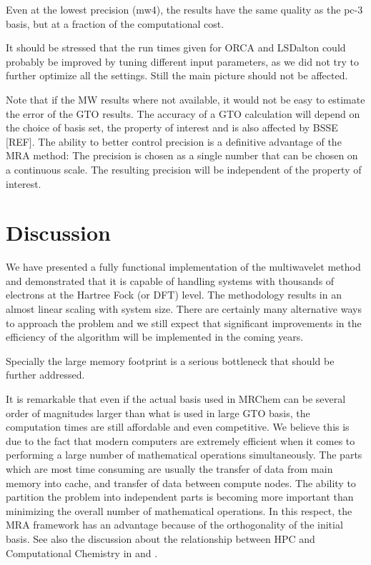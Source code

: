 \documentclass[%
 aip,
 amsmath,amssymb,
 reprint,%
]{revtex4-1}
\begin{document}
Even at the lowest precision (mw4), the results have the same quality as the pc-3 basis, but at a fraction of the computational cost. 

It should be stressed that the run times given for ORCA\cite{orca} and LSDalton\cite{lsdalton} could probably be improved by tuning different input parameters, as we did not try to further optimize all the settings. Still the main picture should not be affected.

Note that if the MW results where not available, it would not be easy to estimate the error of the GTO results. The accuracy of a GTO calculation will depend on the choice of basis set, the property of interest and is also affected by BSSE [REF].
The ability to better control precision is a definitive advantage of the MRA method:
The precision is chosen as a single number that can be chosen on a continuous scale. The resulting precision will be independent of the property of interest. %


\section{Discussion}

We have presented a fully functional implementation of the multiwavelet method and demonstrated that it is capable of handling systems with thousands of electrons at the Hartree Fock (or DFT) level. The methodology results in an almost linear scaling with system size. There are certainly many alternative ways to approach the problem and we still expect that significant improvements in the efficiency of the algorithm will be implemented in the coming years. 

Specially the large memory footprint is a serious bottleneck that should be further addressed. %


It is remarkable that even if the actual basis used in MRChem can be several order of magnitudes larger than what is used in large GTO basis, the computation times are still affordable and even competitive. We believe this is due to the fact that modern computers are extremely efficient when it comes to performing a large number of mathematical operations simultaneously. The parts which are most time consuming are usually the transfer of data from main memory into cache, and transfer of data between compute nodes. The ability to partition the problem into independent parts is becoming more important than minimizing the overall number of mathematical operations. In this respect, the MRA framework has an advantage because of the orthogonality of the initial basis. See also the discussion about the relationship between HPC and Computational Chemistry in \cite{penchoff2021} and \cite{ratcliff2016}.
\end{document}
